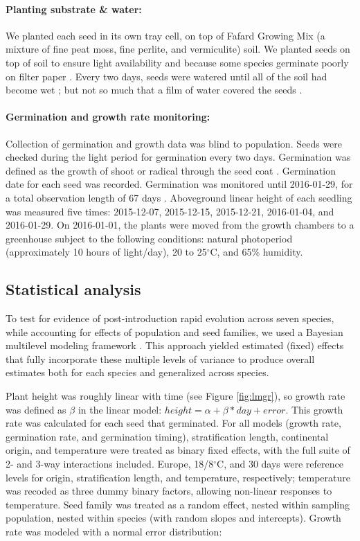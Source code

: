 \documentclass[12pt]{article}\usepackage[]{graphicx}\usepackage[]{color}
\begin{document}
	\paragraph{Planting substrate \& water:} We planted each seed in its own tray cell, on top of Fafard Growing Mix (a mixture of fine peat moss, fine perlite, and vermiculite) soil. We planted seeds on top of soil to ensure light availability \parencite{Tester1987} and because some species germinate poorly on filter paper \parencite{Andrews1974}. Every two days, seeds were watered until all of the soil had become wet \parencite{Steinbauer1957}; but not so much that a film of water covered the seeds \parencite{AOSA1960}.
	
	\paragraph{Germination and growth rate monitoring:}  Collection of germination and growth data was blind to population. Seeds were checked during the light period for germination every two days. Germination was defined as the growth of shoot or radical through the seed coat \parencite{Baskin1998,Popay1970}. Germination date for each seed was recorded.  Germination was monitored until 2016-01-29, for a total observation length of 67 days  \parencite[this is longer than the typical two-week germination trials according to][]{Baskin1998,Wulff1994}. Aboveground linear height of each seedling was measured five times: 2015-12-07, 2015-12-15, 2015-12-21, 2016-01-04, and 2016-01-29. On 2016-01-01, the plants were moved from the growth chambers to a greenhouse subject to the following conditions: natural photoperiod (approximately 10 hours of light/day), 20 to 25$^\circ$C, and 65\% humidity.
	\subsection{Statistical analysis} 
	To test for evidence of post-introduction rapid evolution across seven species, while accounting for effects of population and seed families, we used a Bayesian multilevel modeling framework \parencite{Carpenter2017}. This approach yielded estimated (fixed) effects that fully incorporate these multiple levels of variance to produce overall estimates both for each species and generalized across species.  %

Plant height was roughly linear with time (see Figure \ref{fig:lmgr}), so growth rate was defined as $\beta$ in the linear model: $height = \alpha + \beta*day + error $. This growth rate was calculated for each seed that germinated. For all models (growth rate, germination rate, and germination timing), stratification length, continental origin, and temperature were treated as binary fixed effects, with the full suite of 2- and 3-way interactions included. Europe, 18/8$^\circ$C, and 30 days were reference levels for origin, stratification length, and temperature, respectively; temperature was recoded as three dummy binary factors, allowing non-linear responses to temperature. Seed family was treated as a random effect, nested within sampling population, nested within species (with random slopes and intercepts). Growth rate was modeled with a normal error distribution: 
\end{document}
